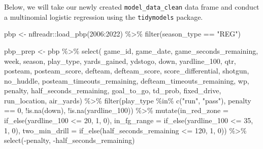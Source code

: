 \documentclass[
  letterpaper,
]{krantz}
\newenvironment{Shaded}{\begin{snugshade}}{\end{snugshade}}
\newcommand{\AttributeTok}[1]{\textcolor[rgb]{0.40,0.45,0.13}{#1}}
\newcommand{\DecValTok}[1]{\textcolor[rgb]{0.68,0.00,0.00}{#1}}
\newcommand{\FunctionTok}[1]{\textcolor[rgb]{0.28,0.35,0.67}{#1}}
\newcommand{\NormalTok}[1]{\textcolor[rgb]{0.00,0.23,0.31}{#1}}
\newcommand{\OtherTok}[1]{\textcolor[rgb]{0.00,0.23,0.31}{#1}}
\newcommand{\SpecialCharTok}[1]{\textcolor[rgb]{0.37,0.37,0.37}{#1}}
\newcommand{\StringTok}[1]{\textcolor[rgb]{0.13,0.47,0.30}{#1}}
\begin{document}
\begin{tcolorbox}
Below, we will take our newly created \texttt{model\_data\_clean} data
frame and conduct a multinomial logistic regression using the
\texttt{tidymodels} package.

\end{tcolorbox}

\begin{Shaded}
\begin{Highlighting}[]
\NormalTok{pbp }\OtherTok{\textless{}{-}}\NormalTok{ nflreadr}\SpecialCharTok{::}\FunctionTok{load\_pbp}\NormalTok{(}\DecValTok{2006}\SpecialCharTok{:}\DecValTok{2022}\NormalTok{) }\SpecialCharTok{\%\textgreater{}\%}
  \FunctionTok{filter}\NormalTok{(season\_type }\SpecialCharTok{==} \StringTok{"REG"}\NormalTok{)}

\NormalTok{pbp\_prep }\OtherTok{\textless{}{-}}\NormalTok{ pbp }\SpecialCharTok{\%\textgreater{}\%}
  \FunctionTok{select}\NormalTok{(}
\NormalTok{    game\_id, game\_date, game\_seconds\_remaining,}
\NormalTok{    week, season, play\_type, yards\_gained,}
\NormalTok{    ydstogo, down, yardline\_100, qtr, posteam,}
\NormalTok{    posteam\_score, defteam, defteam\_score,}
\NormalTok{    score\_differential, shotgun, no\_huddle,}
\NormalTok{    posteam\_timeouts\_remaining, defteam\_timeouts\_remaining,}
\NormalTok{    wp, penalty, half\_seconds\_remaining, goal\_to\_go,}
\NormalTok{    td\_prob, fixed\_drive, run\_location, air\_yards) }\SpecialCharTok{\%\textgreater{}\%}
  \FunctionTok{filter}\NormalTok{(play\_type }\SpecialCharTok{\%in\%} \FunctionTok{c}\NormalTok{(}\StringTok{"run"}\NormalTok{, }\StringTok{"pass"}\NormalTok{),}
\NormalTok{         penalty }\SpecialCharTok{==} \DecValTok{0}\NormalTok{, }\SpecialCharTok{!}\FunctionTok{is.na}\NormalTok{(down), }\SpecialCharTok{!}\FunctionTok{is.na}\NormalTok{(yardline\_100)) }\SpecialCharTok{\%\textgreater{}\%}
  \FunctionTok{mutate}\NormalTok{(}\AttributeTok{in\_red\_zone =} \FunctionTok{if\_else}\NormalTok{(yardline\_100 }\SpecialCharTok{\textless{}=} \DecValTok{20}\NormalTok{, }\DecValTok{1}\NormalTok{, }\DecValTok{0}\NormalTok{),}
         \AttributeTok{in\_fg\_range =} \FunctionTok{if\_else}\NormalTok{(yardline\_100 }\SpecialCharTok{\textless{}=} \DecValTok{35}\NormalTok{, }\DecValTok{1}\NormalTok{, }\DecValTok{0}\NormalTok{),}
         \AttributeTok{two\_min\_drill =} \FunctionTok{if\_else}\NormalTok{(half\_seconds\_remaining }\SpecialCharTok{\textless{}=} \DecValTok{120}\NormalTok{, }\DecValTok{1}\NormalTok{, }\DecValTok{0}\NormalTok{)) }\SpecialCharTok{\%\textgreater{}\%}
  \FunctionTok{select}\NormalTok{(}\SpecialCharTok{{-}}\NormalTok{penalty, }\SpecialCharTok{{-}}\NormalTok{half\_seconds\_remaining)}
\end{Highlighting}
\end{Shaded}
\end{document}
